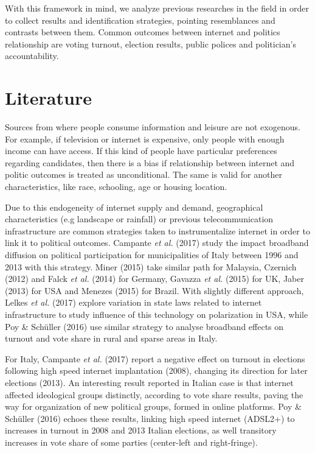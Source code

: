 \documentclass[
  12pt,
]{article}
\begin{document}
With this framework in mind, we analyze previous researches in the field
in order to collect results and identification strategies, pointing
resemblances and contrasts between them. Common outcomes between
internet and politics relationship are voting turnout, election results,
public polices and politician's accountability.

\hypertarget{literature}{%
\section{Literature}\label{literature}}

Sources from where people consume information and leisure are not
exogenous. For example, if television or internet is expensive, only
people with enough income can have access. If this kind of people have
particular preferences regarding candidates, then there is a bias if
relationship between internet and politic outcomes is treated as
unconditional. The same is valid for another characteristics, like race,
schooling, age or housing location.

Due to this endogeneity of internet supply and demand, geographical
characteristics (e.g landscape or rainfall) or previous
telecommunication infrastructure are common strategies taken to
instrumentalize internet in order to link it to political outcomes.
Campante \emph{et al.} (2017) study the impact broadband diffusion on
political participation for municipalities of Italy between 1996 and
2013 with this strategy. Miner (2015) take similar path for Malaysia,
Czernich (2012) and Falck \emph{et al.} (2014) for Germany, Gavazza
\emph{et al.} (2015) for UK, Jaber (2013) for USA and Menezes (2015) for
Brazil. With slightly different approach, Lelkes \emph{et al.} (2017)
explore variation in state laws related to internet infrastructure to
study influence of this technology on polarization in USA, while Poy \&
Schüller (2016) use similar strategy to analyse broadband effects on
turnout and vote share in rural and sparse areas in Italy.

For Italy, Campante \emph{et al.} (2017) report a negative effect on
turnout in elections following high speed internet implantation (2008),
changing its direction for later elections (2013). An interesting result
reported in Italian case is that internet affected ideological groups
distinctly, according to vote share results, paving the way for
organization of new political groups, formed in online platforms. Poy \&
Schüller (2016) echoes these results, linking high speed internet
(ADSL2+) to increases in turnout in 2008 and 2013 Italian elections, as
well transitory increases in vote share of some parties (center-left and
right-fringe).
\end{document}
